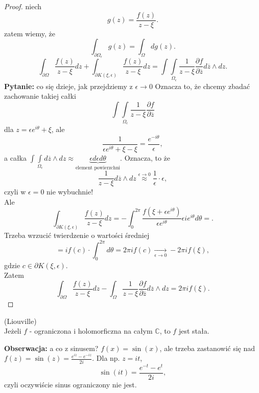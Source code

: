 \documentclass[../main.tex]{subfiles}
\begin{document}
 \begin{proof}
     niech
     \[
         g(z) = \frac{f(z)}{z - \xi}
     .\]
     zatem wiemy, że
     \[
         \int_{\partial \Omega_\epsilon}g(z) = \int_{\Omega} d g(z)
     .\]
 \[
     \int_{\partial \Omega} \frac{f(z)}{z - \xi}dz + \int_{\partial K(\xi, \epsilon)} \frac{f(z)}{z - \xi}dz = \int\int\limits_{\Omega_\epsilon}\frac{1}{z-\xi} \frac{\partial f}{\partial \overline{z}} d\overline{z}\land dz
 .\]
 \textbf{Pytanie:} co się dzieje, jak przejdziemy z $\epsilon\to 0$ Oznacza to, że chcemy zbadać zachowanie takiej całki
     \[
         \int\int\limits_{\Omega_{\epsilon}} \frac{1}{z-\xi}\frac{\partial f}{\partial \overline{z}}
     \]
 dla $z = \epsilon e^{i\theta} + \xi$, ale
     \[
         \frac{1}{\epsilon e^{i\theta} + \xi - \xi} = \frac{e^{-i\theta}}{\epsilon}
     ,\]
 a całka $\int\int\limits_{\Omega_\epsilon} d\overline{z}\land dz \approx \underbrace{\epsilon d\epsilon d\theta}_{\text{element powierzchni}}$.
     Oznacza, to że
     \[
         \frac{1}{z-\xi} d\overline{z}\land dz \overset{\epsilon \to 0}{\approx} \frac{1}{\epsilon} \cdot \epsilon
     ,\]
 czyli w $\epsilon = 0$ nie wybuchnie!\\
     Ale
     \[
         \int_{\partial K(\xi, \epsilon)} \frac{f(z)}{z-\xi} dz = - \int_0^{2\pi} \frac{f(\xi + \epsilon e^{i\theta})}{\epsilon e^{i\theta}} \epsilon i e^{i\theta} d\theta =
     .\]
 Trzeba wrzucić twierdzenie o wartości średniej
     \[
         = i f(c) \cdot \int_{0}^{2\pi}d\theta = 2 \pi i f(c) \underset{\epsilon \to 0}{\longrightarrow}-2\pi i f(\xi)
     ,\]
 gdzie $c\in \partial K(\xi, \epsilon)$.\\
     Zatem
     \[
         \int_{\partial \Omega} \frac{f(z)}{z - \xi}dz - \int_{\Omega}\frac{1}{z-\xi}\frac{\partial f}{\partial \overline{z}} d\overline{z}\land dz = 2 \pi i f(\xi)
     .\]
\end{proof}
\begin{tw}
    (Liouville)\\
    Jeżeli $f$ - ograniczona i holomorficzna na całym $\mathbb{C}$, to $f$ jest stała.
\end{tw}
\textbf{Obserwacja:} a co z sinusem?
$f(x) = \sin(x)$, ale trzeba zastanowić się nad  $f(z) = \sin(z) = \frac{e^{iz} - e^{-iz}}{2i}$. Dla np. $z = it$,
\[
    \sin(it) = \frac{e^{-t} - e^{t}}{2i}
,\]
czyli oczywiście sinus ograniczony nie jest.
\end{document}
